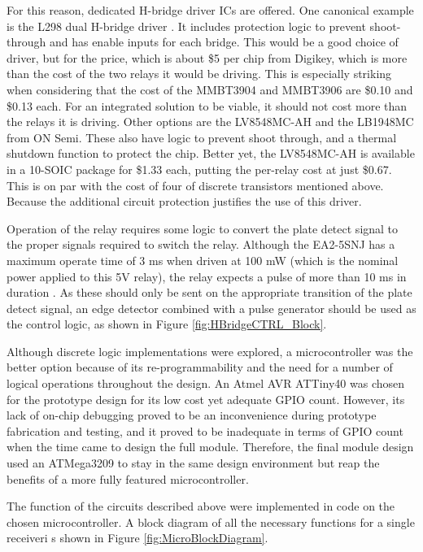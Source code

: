 		For this reason, dedicated H-bridge driver ICs are offered.  One canonical example is the L298 dual H-bridge driver \cite{L298datasheet}.  It includes protection logic to prevent shoot-through and has enable inputs for each bridge.  This would be a good choice of driver, but for the price, which is about \$5 per chip from Digikey, which is more than the cost of the two relays it would be driving.  This is especially striking when considering that the cost of the MMBT3904 and MMBT3906 are \$0.10 and \$0.13 each.  For an integrated solution to be viable, it should not cost more than the relays it is driving.  Other options are the LV8548MC-AH \cite{LV8548MCdatasheet} and the LB1948MC \cite{LB1948MCdatasheet} from ON Semi.  These also have logic to prevent shoot through, and a thermal shutdown function to protect the chip.  Better yet, the LV8548MC-AH is available in a 10-SOIC package for \$1.33 each, putting the per-relay cost at just \$0.67.  This is on par with the cost of four of discrete transistors mentioned above.  Because the additional circuit protection justifies the use of this driver.

		Operation of the relay requires some logic to convert the plate detect signal to the proper signals required to switch the relay.  Although the EA2-5SNJ has a maximum operate time of 3 ms when driven at 100 mW (which is the nominal power applied to this 5V relay), the relay expects a pulse of more than 10 ms in duration \cite{EA2datasheet}.  As these should only be sent on the appropriate transition of the plate detect signal, an edge detector combined with a pulse generator should be used as the control logic, as shown in Figure \ref{fig:HBridgeCTRL_Block}.


		Although discrete logic implementations were explored, a microcontroller was the better option because of its re-programmability and the need for a number of logical operations throughout the design.  An Atmel AVR ATTiny40 was chosen for the prototype design for its low cost yet adequate GPIO count.  However, its lack of on-chip debugging proved to be an inconvenience during prototype fabrication and testing, and it proved to be inadequate in terms of GPIO count when the time came to design the full module.  Therefore, the final module design used an ATMega3209 to stay in the same design environment but reap the benefits of a more fully featured microcontroller.

		The function of the circuits described above were implemented in code on the chosen microcontroller.  A block diagram of all the necessary functions for a single receiveri s shown in Figure \ref{fig:MicroBlockDiagram}.

